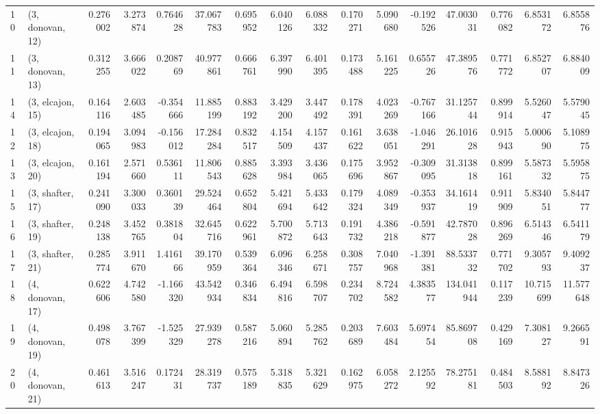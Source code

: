 \begin{tabular}{llrrrrrrrrrrrrrr}
10 &  (3, donovan, 12) &   0.276002 &  3.273874 &  0.764628 &  37.067783 &  0.695952 &   6.040126 &  6.088332 &  0.170271 &  5.090680 & -0.192526 &   47.003031 &  0.776082 &   6.853172 &   6.855876 \\
11 &  (3, donovan, 13) &   0.312255 &  3.666022 &  0.208769 &  40.977861 &  0.666761 &   6.397990 &  6.401395 &  0.173488 &  5.161225 &  0.655726 &   47.389576 &  0.771772 &   6.852707 &   6.884009 \\
14 &  (3, elcajon, 15) &   0.164116 &  2.603485 & -0.354666 &  11.885199 &  0.883192 &   3.429200 &  3.447492 &  0.178391 &  4.023269 & -0.767166 &   31.125744 &  0.899914 &   5.526047 &   5.579045 \\
12 &  (3, elcajon, 18) &   0.194065 &  3.094983 & -0.156012 &  17.284284 &  0.832517 &   4.154509 &  4.157437 &  0.161622 &  3.638051 & -1.046291 &   26.101628 &  0.915943 &   5.000690 &   5.108975 \\
13 &  (3, elcajon, 20) &   0.161194 &  2.571660 &  0.536111 &  11.806543 &  0.885628 &   3.393984 &  3.436065 &  0.175696 &  3.952867 & -0.309095 &   31.313818 &  0.899161 &   5.587332 &   5.595875 \\
15 &  (3, shafter, 17) &   0.241090 &  3.300033 &  0.360139 &  29.524464 &  0.652804 &   5.421694 &  5.433642 &  0.179324 &  4.089349 & -0.353937 &   34.161419 &  0.911909 &   5.834051 &   5.844777 \\
16 &  (3, shafter, 19) &   0.248138 &  3.452765 &  0.381804 &  32.645716 &  0.622961 &   5.700872 &  5.713643 &  0.191732 &  4.386218 & -0.591877 &   42.787028 &  0.896269 &   6.514346 &   6.541179 \\
17 &  (3, shafter, 21) &   0.285774 &  3.911670 &  1.416166 &  39.170959 &  0.539364 &   6.096346 &  6.258671 &  0.308757 &  7.040968 & -1.391381 &   88.533732 &  0.771702 &   9.305793 &   9.409237 \\
18 &  (4, donovan, 17) &   0.622606 &  4.742580 & -1.166320 &  43.542934 &  0.346834 &   6.494816 &  6.598707 &  0.234702 &  8.724582 &  4.383577 &  134.041944 &  0.117239 &  10.715699 &  11.577648 \\
19 &  (4, donovan, 19) &   0.498078 &  3.767399 & -1.525329 &  27.939278 &  0.587216 &   5.060894 &  5.285762 &  0.203689 &  7.603484 &  5.697454 &   85.869708 &  0.429169 &   7.308127 &   9.266591 \\
20 &  (4, donovan, 21) &   0.461613 &  3.516247 &  0.172431 &  28.319737 &  0.575189 &   5.318835 &  5.321629 &  0.162975 &  6.058272 &  2.125592 &   78.275181 &  0.484503 &   8.588192 &   8.847326 \\

\end{tabular}
